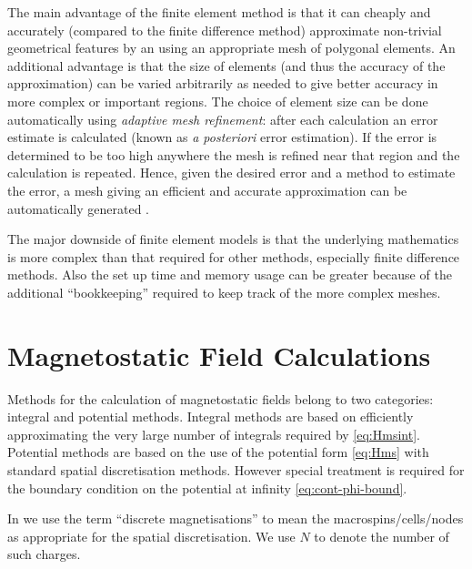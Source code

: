 The main advantage of the finite element method is that it can cheaply and accurately (compared to the finite difference method) approximate non-trivial geometrical features by an using an appropriate mesh of polygonal elements.
An additional advantage is that the size of elements (and thus the accuracy of the approximation) can be varied arbitrarily as needed to give better accuracy in more complex or important regions. 
The choice of element size can be done automatically using \emph{adaptive mesh refinement}: after each calculation an error estimate is calculated (known as \emph{a posteriori} error estimation).
If the error is determined to be too high anywhere the mesh is refined near that region and the calculation is repeated.
Hence, given the desired error and a method to estimate the error, a mesh giving an efficient and accurate approximation can be automatically generated \cite{Schrefl1999}.

The major downside of finite element models is that the underlying mathematics is more complex than that required for other methods, especially finite difference methods.
Also the set up time and memory usage can be greater because of the additional ``bookkeeping'' required to keep track of the more complex meshes.


\section{Magnetostatic Field Calculations}
\label{sec:magn-field-calc}

Methods for the calculation of magnetostatic fields belong to two categories: integral and potential methods.
Integral methods are based on efficiently approximating the very large number of integrals required by \cref{eq:Hmsint}.
Potential methods are based on the use of the potential form \cref{eq:Hms} with standard spatial discretisation methods.
However special treatment is required for the boundary condition on the potential at infinity \cref{eq:cont-phi-bound}.

In  we use the term ``discrete magnetisations'' to mean the macrospins/cells/nodes as appropriate for the spatial discretisation.
We use $N$ to denote the number of such charges.


